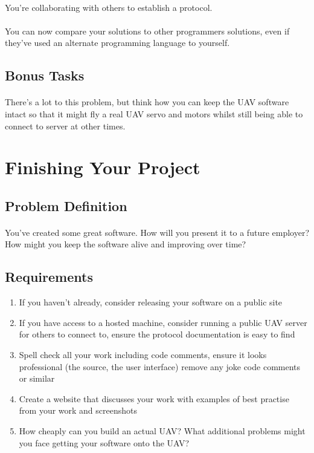 \documentclass[11pt]{book}
\begin{document}
\paragraph{} You're collaborating with others to establish a protocol.

\paragraph{} You can now compare your solutions to other programmers solutions, even if they've used an alternate programming language to yourself.

\subsection{Bonus Tasks}

\paragraph{} There's a lot to this problem, but think how you can keep the UAV software intact so that it might fly a real UAV servo and motors whilst still being able to connect to server at other times.

\clearpage




\section{Finishing Your Project}

\subsection{Problem Definition}

\paragraph{} You've created some great software. How will you present it to a future employer? How might you keep the software alive and improving over time?

\subsection{Requirements}

\begin{enumerate}
\item If you haven't already, consider releasing your software on a public site
\item If you have access to a hosted machine, consider running a public UAV server for others to connect to, ensure the protocol documentation is easy to find
\item Spell check all your work including code comments, ensure it looks professional (the source, the user interface) remove any joke code comments or similar
\item Create a website that discusses your work with examples of best practise from your work and screenshots
\item How cheaply can you build an actual UAV? What additional problems might you face getting your software onto the UAV?
\end{enumerate}
\end{document}
